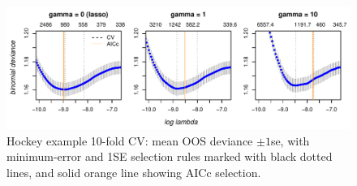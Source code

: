\documentclass[12pt]{article}
\begin{document}
\begin{figure}[tb]
\includegraphics[width=6.3in]{../graphs/nhl_cv}
\caption{\label{nhlcv} Hockey example 10-fold CV: mean OOS deviance $\pm 1$se, with minimum-error and 1SE selection rules marked with black dotted lines, and solid orange line showing AICc selection. }
\end{figure}
\end{document}

